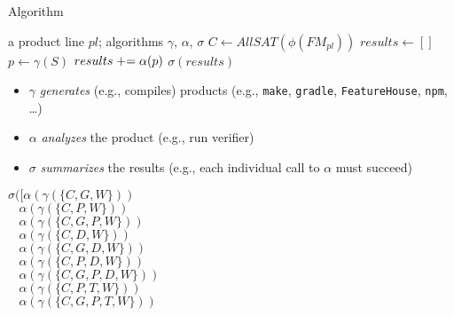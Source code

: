 \begin{frame}{\myframetitle}
	\begin{mycolumns}
		\begin{definition}{Algorithm}
			\begin{algorithmic}
				\Require a product line $pl$; algorithms $\gamma$, $\alpha$, $\sigma$
				\State $C \gets AllSAT(\phi(FM_{pl}))$ 
				\State $results \gets []$
				 
				\State $p \gets \gamma(S)$ 
				\State $results \mathrel{+}= \alpha(p)$ 
				\EndFor
				\State \Return $\sigma(results)$
			\end{algorithmic}
		\end{definition}
		\begin{note}{}
			\begin{itemize}
				\item $\gamma$ \emph{generates} (e.g., compiles) products (e.g., \texttt{make}, \texttt{gradle}, \texttt{FeatureHouse}, \texttt{npm}, \ldots)
				\item $\alpha$ \emph{analyzes} the product (e.g., run verifier)
				\item $\sigma$ \emph{summarizes} the results (e.g., each individual call to $\alpha$ must succeed)
			\end{itemize}
		\end{note}
	\mynextcolumn
		\begin{exampletight}{}
			\begin{center}
				\small\featureDiagramConfigurableDatabase
			\end{center}
		\end{exampletight}
		\begin{example}{}
			\footnotesize
			\begin{mycolumns}[animation=none]
				$\sigma([\alpha(\gamma(\{C,G,W\}))$\\
				$~~~~\alpha(\gamma(\{C,P,W\}))$\\
				$~~~~\alpha(\gamma(\{C,G,P,W\}))$\\
				$~~~~\alpha(\gamma(\{C,D,W\}))$\\
				$~~~~\alpha(\gamma(\{C,G,D,W\}))$\\
				$~~~~\alpha(\gamma(\{C,P,D,W\}))$\\
				$~~~~\alpha(\gamma(\{C,G,P,D,W\}))$\\
				$~~~~\alpha(\gamma(\{C,P,T,W\}))$\\
				$~~~~\alpha(\gamma(\{C,G,P,T,W\}))$\\

\end{mycolumns}
\end{example}
\end{mycolumns}
\end{frame}
